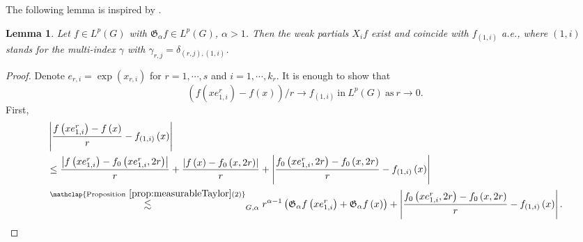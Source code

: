 \documentclass[11pt,reqno]{amsart}
\newtheorem{lemma}[theorem]{Lemma}
\newcommand{\1}{\mathbf 1}
\begin{document}
The following lemma is inspired by \cite[Lemma 2]{dorronsoro1985characterization}.
\begin{lemma}\label{lem:weakFirstDeriv}
Let $f\in L^p\left(G\right)$ with $\mathfrak{G}_\alpha f\in L^p\left(G\right)$, $\alpha>1$. Then the weak partials $X_{i}f$ exist and coincide with $f_{\left(1,i\right)}$ a.e., where $\left(1,i\right)$ stands for the multi-index $\gamma$ with $\gamma_{r,j}=\delta_{\left(r,j\right),\left(1,i\right)}$.
\end{lemma}
\begin{proof}
Denote $e_{r,i}=\exp\left(x_{r,i}\right)$ for $r=1,\cdots,s$ and $i=1,\cdots,k_r$.
It is enough to show that
\[
\left(f\left(x e_{1,i}^r\right)-f\left(x\right)\right)/r\to f_{\left(1,i\right)} \mathrm{~in~}L^p\left(G\right) \mathrm{~as~}r\to 0.
\]
First,
\begin{align*}
    &\left|\frac{f\left(x e_{1,i}^r\right)-f\left(x\right)}{r}-f_{\left(1,i\right)}\left(x\right)\right|\\
    &\le \frac{\left|f\left(x e_{1,i}^r\right)-f_0\left(xe_{1,i}^r,2r\right)\right|}{r}+\frac{\left|f\left(x\right)-f_0\left(x,2r\right)\right|}{r}+\left|\frac{f_0\left(xe_{1,i}^r,2r\right)-f_0\left(x,2r\right)}{r}-f_{\left(1,i\right)}\left(x\right)\right|\\
    &\stackrel{\mathclap{\mathrm{Proposition}~\ref{prop:measurableTaylor}(2)}}{\lesssim}_{G,\alpha} r^{\alpha-1}\left(\mathfrak{G}_\alpha f\left(xe_{1,i}^r\right)+\mathfrak{G}_\alpha f\left(x\right)\right)+\left|\frac{f_0\left(xe_{1,i}^r,2r\right)-f_0\left(x,2r\right)}{r}-f_{\left(1,i\right)}\left(x\right)\right|.
\end{align*}


\end{proof}
\end{document}
